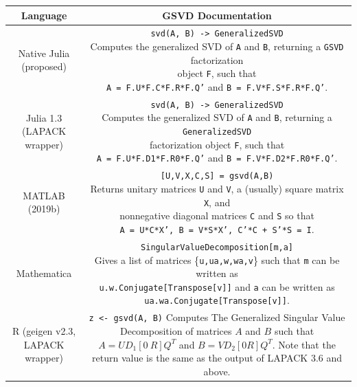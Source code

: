     \begin{table}[H]
        \centering
        \begin{tabular}{|c|c|}
            \hline
            Language & GSVD Documentation \\ \hline\hline
            Native Julia (proposed) &  \makecell[l]{\texttt{svd(A, B) -> GeneralizedSVD} \\ Computes the generalized SVD of \texttt{A} and \texttt{B},  returning a \texttt{GSVD} factorization\\ object \texttt{F}, such that \\ \texttt{A = F.U*F.C*F.R*F.Q'} and \texttt{B = F.V*F.S*F.R*F.Q'}.}\\ \hline
            Julia 1.3 (LAPACK wrapper) &  \makecell[l]{\texttt{svd(A, B) -> GeneralizedSVD} \\ Computes the generalized SVD of \texttt{A} and \texttt{B},  returning a \texttt{GeneralizedSVD}\\ factorization object \texttt{F}, such that \\ \texttt{A = F.U*F.D1*F.R0*F.Q'} and \texttt{B = F.V*F.D2*F.R0*F.Q'}.}\\ \hline
            MATLAB (2019b) & \makecell[l]{\texttt{[U,V,X,C,S] = gsvd(A,B)} \\
            Returns unitary matrices \texttt{U} and \texttt{V}, a (usually) square matrix \texttt{X}, and \\ nonnegative diagonal matrices \texttt{C} and \texttt{S} so that \\
                \texttt{A = U*C*X', B = V*S*X', C'*C + S'*S = I}.}\\ \hline
            Mathematica & \makecell[l]{\texttt{SingularValueDecomposition[{m,a}]} \\
            Gives a list of matrices \{\texttt{{u,ua},{w,wa},v}\} such that \texttt{m} can be written as \\ \texttt{u.w.Conjugate[Transpose[v]]} and \texttt{a} can be written as \\ \texttt{ua.wa.Conjugate[Transpose[v]]}. } \\ \hline
            R (geigen v2.3, LAPACK wrapper) & \makecell[l]{\texttt{z <- gsvd(A, B)}\\
            Computes The Generalized Singular Value Decomposition of matrices \\ $A$ and $B$ such that $A = UD_{1}[0 \ R]Q^{T}$ and $B = VD_{2}[0 R]Q^{T}$. Note that \\ the return value is the same as the output of LAPACK 3.6 and above. }

\end{tabular}
\end{table}
